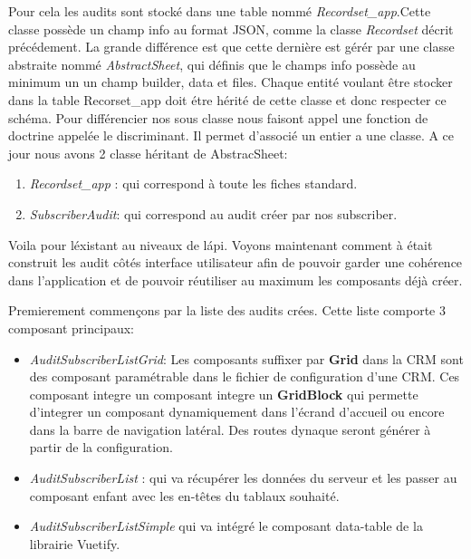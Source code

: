 Pour cela les audits sont stocké dans une table nommé \textit{Recordset\_app}.Cette classe possède un champ info au format JSON, comme la classe \textit{Recordset}  décrit précédement. La grande différence est que cette dernière est gérér par une classe abstraite nommé \textit{AbstractSheet}, qui définis que le champs info possède au minimum un un champ builder, data et files. Chaque entité voulant être stocker dans la table Recorset\_app doit étre hérité de cette classe et donc respecter ce schéma. Pour différencier nos sous classe nous faisont appel une fonction de doctrine appelée le discriminant. Il permet d'associé un entier a une classe. A ce jour nous avons 2 classe héritant de AbstracSheet: 
\begin{enumerate}
    \item \textit{Recordset\_app} : qui correspond à toute les fiches standard. 
    \item \textit{SubscriberAudit}: qui correspond au audit créer par nos subscriber. 
\end{enumerate}

Voila pour l\'existant au niveaux de l\'api. Voyons maintenant comment à était construit les audit côtés interface utilisateur afin de pouvoir garder une cohérence dans l'application et de pouvoir réutiliser au maximum les composants déjà créer. 

Premierement commençons par la liste des audits crées. Cette liste comporte 3 composant principaux: 
\begin{itemize}
    \item  \textit{AuditSubscriberListGrid}: Les composants suffixer par \textbf{Grid} dans la CRM sont des composant paramétrable dans le fichier de configuration d'une CRM. Ces composant integre un composant integre un \textbf{GridBlock} qui permette d'integrer un composant dynamiquement dans l'écrand d'accueil ou encore dans la barre de navigation latéral. Des routes dynaque seront générer à partir de la configuration.
    \item \textit{AuditSubscriberList} : qui va récupérer les données du serveur et les passer au composant enfant avec les en-têtes du tablaux souhaité.  
    \item \textit{AuditSubscriberListSimple} qui va intégré le composant data-table de la librairie Vuetify. 
\end{itemize}

